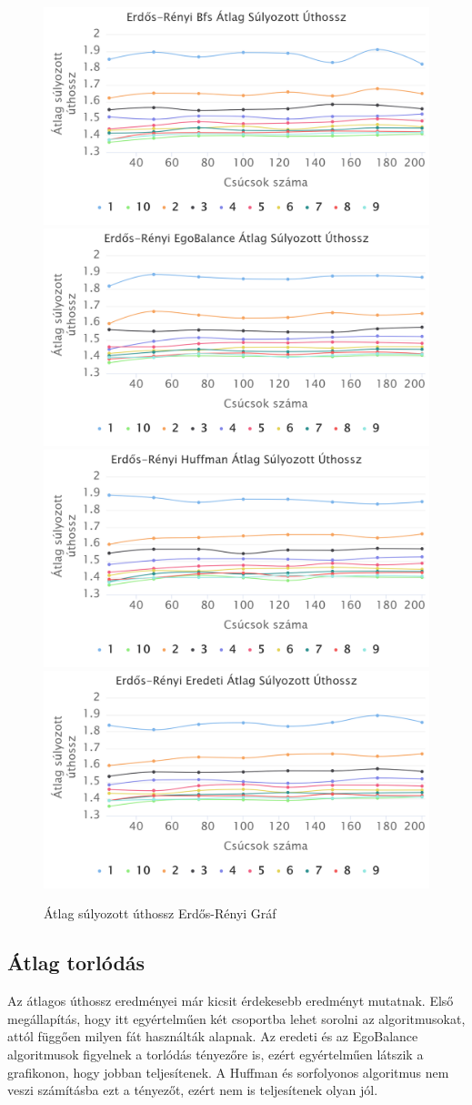 \documentclass[12pt]{report}
\begin{document}
\begin{figure}[H]
	\begin{center}
		\includegraphics[width=0.49\linewidth]{pictures/erdos_avg_len_bfs.png}
		\includegraphics[width=0.49\linewidth]{pictures/erdos_avg_len_egobalance.png}
		\includegraphics[width=0.49\linewidth]{pictures/erdos_avg_len_huffman.png}
		\includegraphics[width=0.49\linewidth]{pictures/erdos_avg_len_original.png}
		\caption{Átlag súlyozott úthossz Erdős-Rényi Gráf}
		\label{avg-len-erdos-renyi}
	\end{center}
\end{figure}

\subsection{Átlag torlódás}

Az átlagos úthossz eredményei már kicsit érdekesebb eredményt mutatnak.
Első megállapítás, hogy itt egyértelműen két csoportba lehet sorolni az algoritmusokat, attól függően milyen fát használták alapnak.
Az eredeti és az EgoBalance algoritmusok figyelnek a torlódás tényezőre is, ezért egyértelműen látszik a grafikonon, hogy jobban teljesítenek.
A Huffman és sorfolyonos algoritmus nem veszi számításba ezt a tényezőt, ezért nem is teljesítenek olyan jól.
\end{document}

